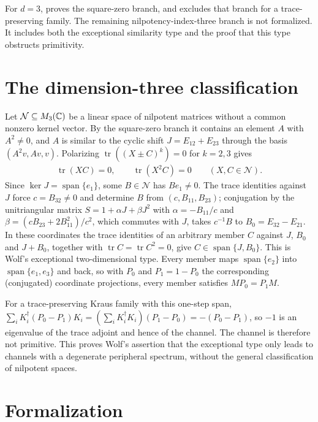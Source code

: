 \documentclass[11pt]{article}
\begin{document}
For $d=3$,
 proves the
square-zero branch, and
 excludes
that branch for a trace-preserving family. The remaining
nilpotency-index-three branch is not formalized. It includes both the
exceptional similarity type and the proof that this type obstructs
primitivity.

\section{The dimension-three classification}

Let $\mathcal N\subseteq M_{3}(\mathbb{C})$ be a linear space of nilpotent matrices without
a common nonzero kernel vector. By the square-zero branch it contains an
element $A$ with $A^2\neq0$, and $A$ is similar to the cyclic shift
$J=E_{12}+E_{23}$ through the basis $(A^2v,Av,v)$. Polarizing
$\operatorname{tr}((X\pm C)^k)=0$ for $k=2,3$ gives
\begin{align*}
    \operatorname{tr}(XC)=0,\qquad\operatorname{tr}(X^2C)=0
    \qquad(X,C\in\mathcal N).
\end{align*}
Since $\ker J=\operatorname{span}\{e_1\}$, some $B\in\mathcal N$ has
$Be_1\neq0$. The trace identities against $J$ force $c=B_{32}\neq0$ and
determine $B$ from $(c,B_{11},B_{23})$; conjugation by the unitriangular
matrix $S=1+\alpha J+\beta J^2$ with $\alpha=-B_{11}/c$ and
$\beta=(cB_{23}+2B_{11}^2)/c^2$, which commutes with $J$, takes $c^{-1}B$
to $B_0=E_{32}-E_{21}$. In these coordinates the trace identities of an
arbitrary member $C$ against $J$, $B_0$ and $J+B_0$, together with
$\operatorname{tr}C=\operatorname{tr}C^2=0$, give $C\in\operatorname{span}\{J,B_0\}$.
This is Wolf's exceptional two-dimensional type. Every member maps
$\operatorname{span}\{e_2\}$ into $\operatorname{span}\{e_1,e_3\}$ and back,
so with $P_0$ and $P_1=1-P_0$ the corresponding (conjugated) coordinate
projections, every member satisfies $MP_0=P_1M$.

For a trace-preserving Kraus family with this one-step span,
$\sum_iK_i^\dagger(P_0-P_1)K_i=(\sum_iK_i^\dagger K_i)(P_1-P_0)=-(P_0-P_1)$,
so $-1$ is an eigenvalue of the trace adjoint and hence of the channel. The
channel is therefore not primitive. This proves Wolf's assertion that the
exceptional type only leads to channels with a degenerate peripheral
spectrum, without the general classification of nilpotent spaces.

\section{Formalization}
\end{document}
